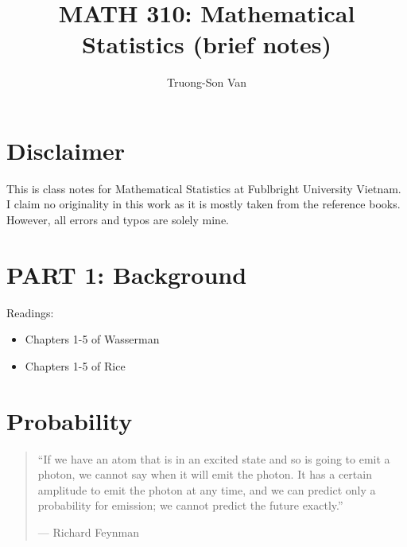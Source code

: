 \documentclass[
  openany]{book}
\title{MATH 310: Mathematical Statistics (brief notes)}
\author{Truong-Son Van}
\date{}
\theoremstyle{definition}
\theoremstyle{definition}
\theoremstyle{definition}
\theoremstyle{definition}
\theoremstyle{remark}
\begin{document}
\maketitle

{
\setcounter{tocdepth}{2}
\tableofcontents
}
\chapter*{Disclaimer}\label{disclaimer}


This is class notes for Mathematical Statistics at Fublbright University Vietnam.
I claim no originality in this work as it is mostly taken from the reference books.
However, all errors and typos are solely mine.

\newcommand{\vectorproj}[2][]{\mathrm{proj}_{\vect{#1}}\vect{#2}}
\newcommand{\vectorcomp}[2][]{\mathrm{comp}_{\vect{#1}}\vect{#2}}
\newcommand{\vect}{\mathbf}
\newcommand{\Var}{\mathrm{Var}}
\newcommand{\Cov}{\mathrm{Cov}}
\newcommand{\R}{\mathbb{R}}
\newcommand{\C}{\mathbb{C}}
\newcommand{\eqd}{\stackrel{d}{=}}
\newcommand{\V}{\mathbb{V}}
\newcommand{\N}{\mathbb{N}}
\newcommand{\E}{\mathbb{E}}
\renewcommand{\P}{\mathbb{P}}
\newcommand{\cP}{\mathcal{P}}
\newcommand{\cF}{\mathcal{F}}
\newcommand{\cB}{\mathcal{B}}
\newtheorem{question}{Question}

\newpage

\chapter*{PART 1: Background}\label{part-1-background}


Readings:

\begin{itemize}
\item
  Chapters 1-5 of Wasserman
\item
  Chapters 1-5 of Rice
\end{itemize}

\chapter{Probability}\label{probability}

\begin{quote}
``If we have an atom that is in an excited state and so is going to emit a photon, we cannot say when it will emit the photon. It has a certain amplitude to emit the photon at any time, and we can predict only a probability for emission; we cannot predict the future exactly.''

\hfill --- Richard Feynman
\end{quote}
\end{document}
